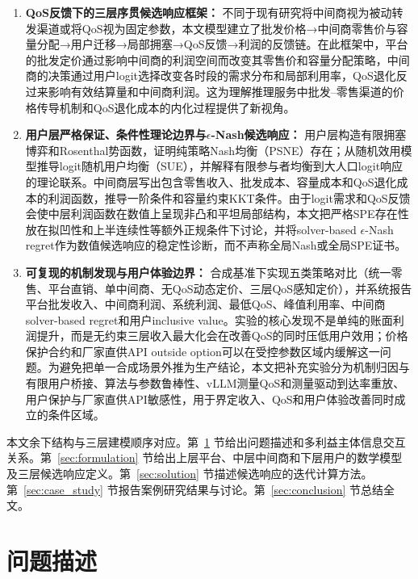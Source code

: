 \documentclass[UTF8,11pt]{ctexart}
\begin{document}
\begin{enumerate}[leftmargin=2em]
  \item \textbf{QoS反馈下的三层序贯候选响应框架：} 不同于现有研究将中间商视为被动转发渠道或将QoS视为固定参数，本文模型建立了批发价格→中间商零售价与容量分配→用户迁移→局部拥塞→QoS反馈→利润的反馈链。在此框架中，平台的批发定价通过影响中间商的利润空间而改变其零售价和容量分配策略，中间商的决策通过用户logit选择改变各时段的需求分布和局部利用率，QoS退化反过来影响有效结算量和中间商利润。这为理解推理服务中批发--零售渠道的价格传导机制和QoS退化成本的内化过程提供了新视角。
  \item \textbf{用户层严格保证、条件性理论边界与$\epsilon$-Nash候选响应：} 用户层构造有限拥塞博弈和Rosenthal势函数，证明纯策略Nash均衡（PSNE）存在；从随机效用模型推导logit随机用户均衡（SUE），并解释有限参与者均衡到大人口logit响应的理论联系。中间商层写出包含零售收入、批发成本、容量成本和QoS退化成本的利润函数，推导一阶条件和容量约束KKT条件。由于logit需求和QoS反馈会使中层利润函数在数值上呈现非凸和平坦局部结构，本文把严格SPE存在性放在拟凹性和上半连续性等额外正规条件下讨论，并将solver-based $\epsilon$-Nash regret作为数值候选响应的稳定性诊断，而不声称全局Nash或全局SPE证书。
  \item \textbf{可复现的机制发现与用户体验边界：} 合成基准下实现五类策略对比（统一零售、平台直销、单中间商、无QoS动态定价、三层QoS感知定价），并系统报告平台批发收入、中间商利润、系统利润、最低QoS、峰值利用率、中间商solver-based regret和用户inclusive value。实验的核心发现不是单纯的账面利润提升，而是无约束三层收入最大化会在改善QoS的同时压低用户效用；价格保护合约和厂家直供API outside option可以在受控参数区域内缓解这一问题。为避免把单一合成场景外推为生产结论，本文把补充实验分为机制归因与有限用户桥接、算法与参数鲁棒性、vLLM测量QoS和测量驱动到达率重放、用户保护与厂家直供API敏感性，用于界定收入、QoS和用户体验改善同时成立的条件区域。
\end{enumerate}

本文余下结构与三层建模顺序对应。第~\ref{sec:problem} 节给出问题描述和多利益主体信息交互关系。第~\ref{sec:formulation} 节给出上层平台、中层中间商和下层用户的数学模型及三层候选响应定义。第~\ref{sec:solution} 节描述候选响应的迭代计算方法。第~\ref{sec:case_study} 节报告案例研究结果与讨论。第~\ref{sec:conclusion} 节总结全文。

\section{问题描述}
\label{sec:problem}
\end{document}
